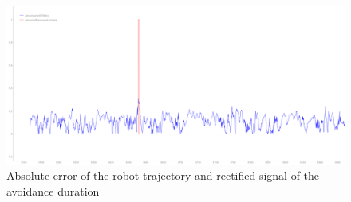 \begin{figure}[H]
	\includegraphics[width=\textwidth]{Pictures/final analysis no obstacle}
	\caption{Absolute error of the robot trajectory and rectified signal of the avoidance duration}
	\label{noobserr}
\end{figure}

